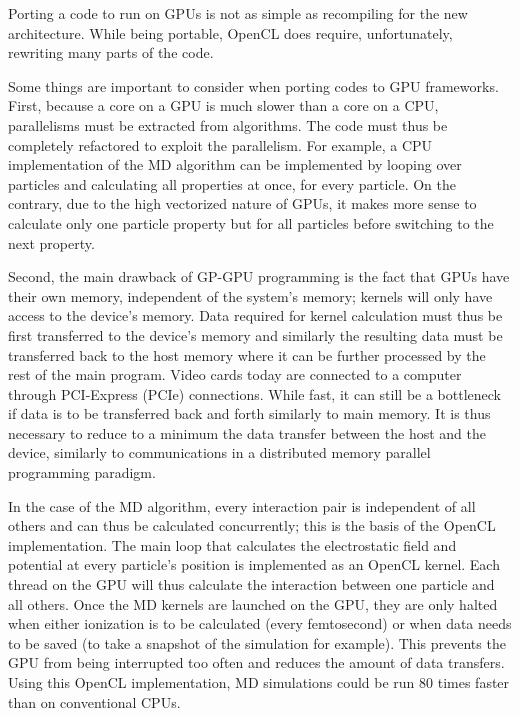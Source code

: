 Porting a code to run on GPUs is not as simple as recompiling
for the new architecture. While being portable, OpenCL does require, unfortunately, rewriting
many parts of the code.



Some things are important to consider when porting codes to GPU frameworks.
First, because a core on a GPU is much slower than a core on a CPU,
parallelisms must be extracted from algorithms. The code must thus be
completely refactored to exploit the parallelism. For example, a CPU
implementation of the MD algorithm can be implemented by looping over particles
and calculating all properties at once, for every particle. On the contrary,
due to the high vectorized nature of GPUs, it makes more sense to calculate
only one particle property but for all particles before switching to the next
property.

Second, the main drawback of
GP-GPU programming is the fact that GPUs have their own memory, independent of
the system's memory; kernels will only have access to the device's memory. Data
required for kernel calculation must thus be first transferred to the device's
memory and similarly the resulting data must be transferred back to the host
memory where it can be further processed by the rest of the main program. Video
cards today are connected to a computer through PCI-Express (PCIe) connections.
While fast, it can still be a bottleneck if data is to be transferred back and
forth similarly to main memory. It is thus necessary to reduce to a minimum the
data transfer between the host and the device, similarly to communications in a
distributed memory parallel programming paradigm.

In the case of the MD algorithm, every interaction pair is independent of all
others and can thus be calculated concurrently; this is the basis of the
OpenCL implementation. The main loop that calculates the electrostatic field
and potential at every particle's position is implemented as an OpenCL kernel.
Each thread on the GPU will thus calculate the interaction between one particle
and all others. Once the MD kernels are launched on the GPU, they are only
halted when either ionization is to be calculated (every femtosecond) or
when data needs to be saved (to take a snapshot of the simulation for example).
This prevents the GPU from being interrupted too often and reduces the amount of
data transfers. Using this OpenCL implementation, MD simulations could be run
80 times faster than on conventional CPUs.

